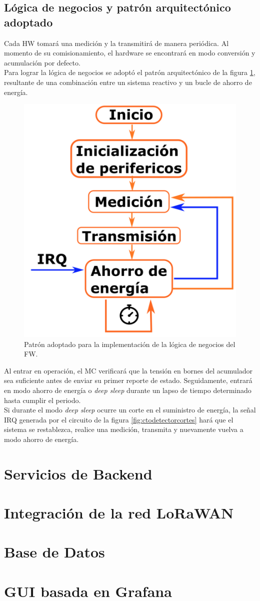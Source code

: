 \subsection{Lógica de negocios y patrón arquitectónico adoptado}
Cada HW tomará una medición y la transmitirá de manera periódica. Al momento de su comisionamiento, el hardware se encontrará en modo conversión y acumulación por defecto.\\
Para lograr la lógica de negocios se adoptó el patrón arquitectónico de la figura \ref{fig:patronpowersaveloop}, resultante de una combinación entre un sistema reactivo y un bucle de ahorro de energía.\\
\begin{figure}[h!]
	\centering
	\includegraphics[width=0.7\linewidth]{Figures/patron_power_save_loop}
	\caption{Patrón adoptado para la implementación de la lógica de negocios del FW.}
	\label{fig:patronpowersaveloop}
\end{figure}
Al entrar en operación, el MC verificará que la tensión en bornes del acumulador sea suficiente antes de enviar su primer reporte de estado. Seguidamente, entrará en modo ahorro de energía o \textit{deep sleep} durante un lapso de tiempo determinado hasta cumplir el periodo.\\
Si durante el modo \textit{deep sleep} ocurre un corte en el suministro de energía, la señal IRQ generada por el circuito de la figura \ref{fig:ctodetectorcortes} hará que el sistema se restablezca, realice una medición, transmita y nuevamente vuelva a modo ahorro de energía.\\

\section{Servicios de Backend}
\label{seccion_bes}

\section{Integraci\'{o}n de la red LoRaWAN}

\section{Base de Datos}

\section{GUI basada en Grafana}

